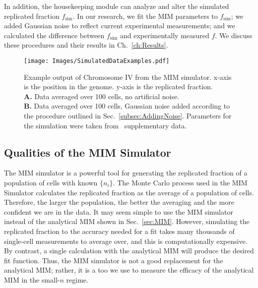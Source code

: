 		In addition, the housekeeping module can analyze and alter the simulated replicated fraction $f_\text{sim}$.
		In our research, we fit the MIM parameters to $f_\text{sim}$; we added Gaussian noise to reflect current experimental measurements; and we calculated the difference between $f_\text{sim}$ and experimentally measured $f$.
		We discuss these procedures and their results in Ch.~\ref{ch:Results}.
		
		\begin{figure}[tbh]
			\begin{center}
				\texttt{[image: Images/SimulatedDataExamples.pdf]}
			\end{center}
				\caption[Simulated Replicated Fraction for Chromosome IV]{\label{fig:SimulatedExample}
					Example output of Chromosome IV from the MIM simulator.
					x-axis is the position in the genome.
					y-axis is the replicated fraction.\\
					\textbf{A.} Data averaged over 100 cells, no artificial noise.\\
					\textbf{B.} Data averaged over 100 cells, Gaussian noise added according to the procedure outlined in Sec.~\ref{subsec:AddingNoise}.
					Parameters for the simulation were taken from~\cite{ScottsPaper} supplementary data.
				}
		\end{figure}	
		
		
		\subsection{Qualities of the MIM Simulator}
		\label{subsec:QualitiesofMIMSimulator}
		
		The MIM simulator is a powerful tool for generating the replicated fraction of a population of cells with known $\{n_i\}$.
		The Monte Carlo process used in the MIM Simulator calculates the replicated fraction as the average of a population of cells.
		Therefore, the larger the population, the better the averaging and the more confident we are in the data.
		It may seem simple to use the MIM simulator instead of the analytical MIM shown in Sec.~\ref{sec:MIM}.
		However, simulating the replicated fraction to the accuracy needed for a fit takes many thousands of single-cell measurements to average over, and this is computationally expensive.
		By contrast, a single calculation with the analytical MIM will produce the desired fit function.
		Thus, the MIM simulator is not a good replacement for the analytical MIM; rather, it is a too we use to measure the efficacy of the analytical MIM in the small-$n$ regime.
		
